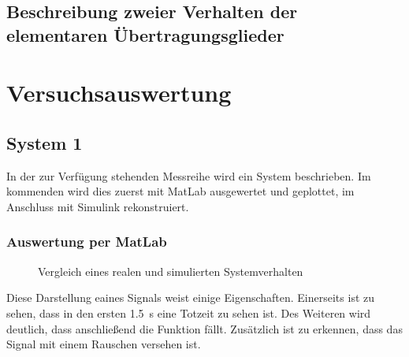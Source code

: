 \documentclass[12pt, oneside, a4paper]{scrreprt}
\begin{document}
\section{Beschreibung zweier Verhalten der elementaren Übertragungsglieder}

\chapter{Versuchsauswertung}
\section{System 1}
In der zur Verfügung stehenden Messreihe wird ein System beschrieben. Im kommenden wird dies zuerst mit MatLab ausgewertet und geplottet, im Anschluss mit Simulink rekonstruiert. 
\subsection{Auswertung per MatLab}





\begin{figure}[H]
\centering
{}
\caption{Vergleich eines realen und simulierten Systemverhalten}
\end{figure}

Diese Darstellung eaines Signals weist einige Eigenschaften. Einerseits ist zu sehen, dass in den ersten \SI{1.5}{\second} eine Totzeit zu sehen ist. Des Weiteren wird deutlich, dass anschließend die Funktion fällt. Zusätzlich ist zu erkennen, dass das Signal mit einem Rauschen versehen ist.
\end{document}
